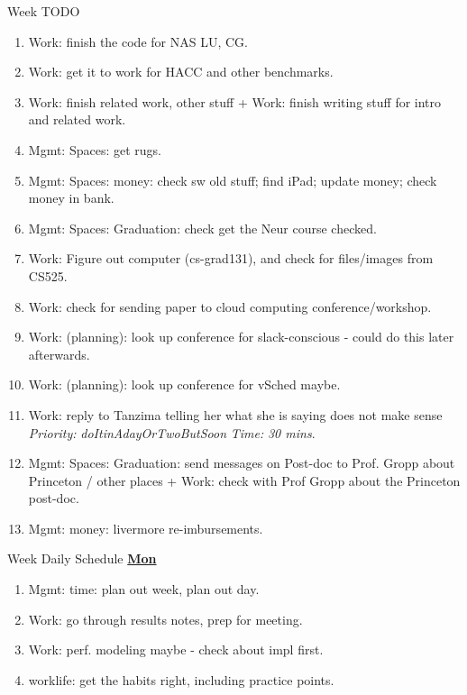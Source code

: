 \documentclass[serif, mathserif, final]{beamer}
\newcommand{\timeEst}[1]{\textit{Time:} \textit{#1}}
\newcommand{\priority}[1]{\textit{Priority:} \textit{#1}}
\begin{document}
\begin{frame}{}
\begin{columns}
\begin{column}{0.50\linewidth}
\begin{block}{Week TODO}
\begin{enumerate}
\item \tiny Work: finish the code for NAS LU, CG. 
\item \tiny Work: get it to work for HACC and other benchmarks. 
\item \tiny Work: finish related work, other stuff + Work: finish writing stuff for intro and related work. 

\item \tiny Mgmt: Spaces: get rugs. 
\item \tiny Mgmt: Spaces: money: check sw old stuff; find iPad; update money; check money in bank. 
\item \tiny Mgmt: Spaces: Graduation: check get the Neur course checked. 

\item \tiny Work: Figure out computer (cs-grad131), and check for files/images from CS525. 

\item \tiny Work: check for sending paper to cloud computing conference/workshop. 
\item \tiny Work: (planning): look up conference for slack-conscious  - could do this later afterwards. 

\item \tiny Work: (planning): look up conference for vSched maybe. 

\item \tiny Work: reply to Tanzima telling her what she is saying does
  not make sense \priority{doItinAdayOrTwoButSoon} \timeEst{30 mins}.
\item \tiny Mgmt: Spaces: Graduation: send messages on Post-doc to
  Prof. Gropp about Princeton / other places + Work: check with Prof
  Gropp about the Princeton post-doc. 
\item \tiny Mgmt: money: livermore re-imbursements. 
\end{enumerate}
\end{block} 


\begin{block}{Week Daily Schedule} 
\textbf{\small \underline{Mon}}
\begin{enumerate} 
\item \tiny Mgmt: time: plan out week, plan out day.  
\item  \tiny Work: go through results notes, prep for meeting. 
\item \tiny Work: perf. modeling maybe - check about impl first. 
\item \tiny worklife: get the habits right, including practice points. 


\end{enumerate}
\end{block}
\end{column}
\end{columns}
\end{frame}
\end{document}
